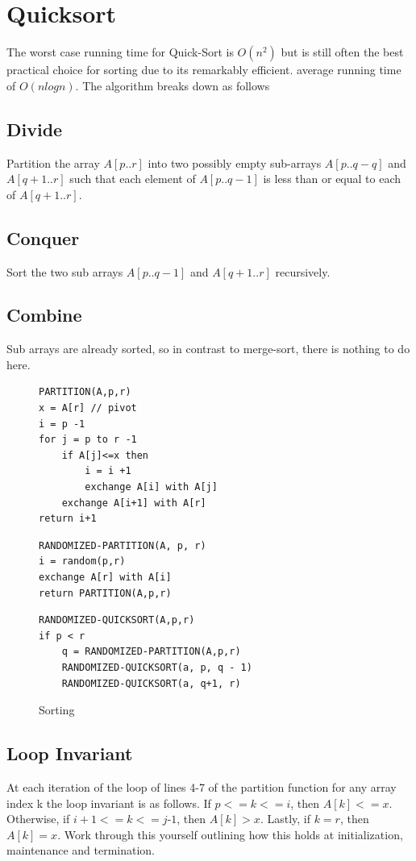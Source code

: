 \documentclass[10pt,a4paper]{article}
\begin{document}
\section{Quicksort}
The worst case running time for Quick-Sort is $O(n^2)$ but is still often the best practical choice for sorting due to its remarkably efficient.  average running time of $O(nlogn)$. The algorithm breaks down as follows
\subsection{Divide}
Partition the array $A[p..r]$ into two possibly empty sub-arrays $A[p..q-q]$ and $A[q+1..r]$ such that each element of $A[p..q-1]$ is less than or equal to each of $A[q+1..r]$.
\subsection{Conquer}
Sort the two sub arrays $A[p..q-1]$ and $A[q+1..r]$ recursively. 
\subsection{Combine}
Sub arrays are already sorted, so in contrast to merge-sort, there is nothing to do here. 



\begin{figure}
\caption{Sorting}
\begin{center}

\begin{lstlisting}
PARTITION(A,p,r)
x = A[r] // pivot
i = p -1 
for j = p to r -1 
	if A[j]<=x then
		i = i +1
		exchange A[i] with A[j]
	exchange A[i+1] with A[r]		
return i+1		
\end{lstlisting}



\begin{lstlisting}
RANDOMIZED-PARTITION(A, p, r)
i = random(p,r)
exchange A[r] with A[i]
return PARTITION(A,p,r)
\end{lstlisting}


\begin{lstlisting}
RANDOMIZED-QUICKSORT(A,p,r)
if p < r 
	q = RANDOMIZED-PARTITION(A,p,r)
	RANDOMIZED-QUICKSORT(a, p, q - 1)
	RANDOMIZED-QUICKSORT(a, q+1, r)
\end{lstlisting}

\label{quicksort}
\end{center}
\end{figure}

\subsection{Loop Invariant}
At each iteration of the loop of lines 4-7 of the partition function for any array index k the loop invariant is as follows. If $p<=k <= i$, then $A[k] <= x$. Otherwise, if $i+1 <= k <= j‐1$, then $A[k]>x$. Lastly, if $k = r$, then $A[k] = x$. Work through this yourself outlining how this holds at initialization, maintenance and termination.  
\end{document}
